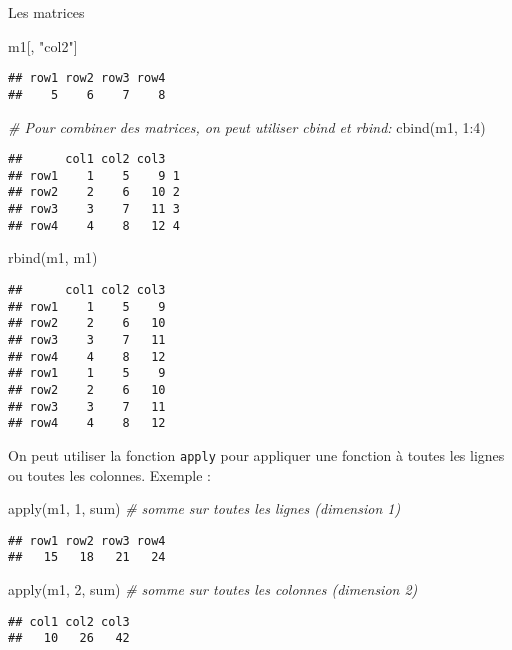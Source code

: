 \documentclass[10pt,xcolor=table,color={dvipsnames,usenames},ignorenonframetext,usepdftitle=false,french]{beamer}
\newenvironment{Shaded}{\begin{snugshade}}{\end{snugshade}}
\newcommand{\CommentTok}[1]{\textcolor[rgb]{0.56,0.35,0.01}{\textit{#1}}}
\newcommand{\DecValTok}[1]{\textcolor[rgb]{0.00,0.00,0.81}{#1}}
\newcommand{\FunctionTok}[1]{\textcolor[rgb]{0.00,0.00,0.00}{#1}}
\newcommand{\NormalTok}[1]{#1}
\newcommand{\SpecialCharTok}[1]{\textcolor[rgb]{0.00,0.00,0.00}{#1}}
\newcommand{\StringTok}[1]{\textcolor[rgb]{0.31,0.60,0.02}{#1}}
\begin{document}
\begin{frame}{Les matrices}
\begin{Shaded}
\begin{Highlighting}[]
\NormalTok{m1[, }\StringTok{"col2"}\NormalTok{]}
\end{Highlighting}
\end{Shaded}

\begin{verbatim}
## row1 row2 row3 row4 
##    5    6    7    8
\end{verbatim}

\begin{Shaded}
\begin{Highlighting}[]
\CommentTok{\# Pour combiner des matrices, on peut utiliser cbind et rbind:}
\FunctionTok{cbind}\NormalTok{(m1, }\DecValTok{1}\SpecialCharTok{:}\DecValTok{4}\NormalTok{)}
\end{Highlighting}
\end{Shaded}

\begin{verbatim}
##      col1 col2 col3  
## row1    1    5    9 1
## row2    2    6   10 2
## row3    3    7   11 3
## row4    4    8   12 4
\end{verbatim}

\begin{Shaded}
\begin{Highlighting}[]
\FunctionTok{rbind}\NormalTok{(m1, m1)}
\end{Highlighting}
\end{Shaded}

\begin{verbatim}
##      col1 col2 col3
## row1    1    5    9
## row2    2    6   10
## row3    3    7   11
## row4    4    8   12
## row1    1    5    9
## row2    2    6   10
## row3    3    7   11
## row4    4    8   12
\end{verbatim}

On peut utiliser la fonction \texttt{apply} pour appliquer une fonction
à toutes les lignes ou toutes les colonnes. Exemple :

\begin{Shaded}
\begin{Highlighting}[]
\FunctionTok{apply}\NormalTok{(m1, }\DecValTok{1}\NormalTok{, sum) }\CommentTok{\# somme sur toutes les lignes (dimension 1)}
\end{Highlighting}
\end{Shaded}

\begin{verbatim}
## row1 row2 row3 row4 
##   15   18   21   24
\end{verbatim}

\begin{Shaded}
\begin{Highlighting}[]
\FunctionTok{apply}\NormalTok{(m1, }\DecValTok{2}\NormalTok{, sum) }\CommentTok{\# somme sur toutes les colonnes (dimension 2)}
\end{Highlighting}
\end{Shaded}

\begin{verbatim}
## col1 col2 col3 
##   10   26   42
\end{verbatim}
\end{frame}
\end{document}
